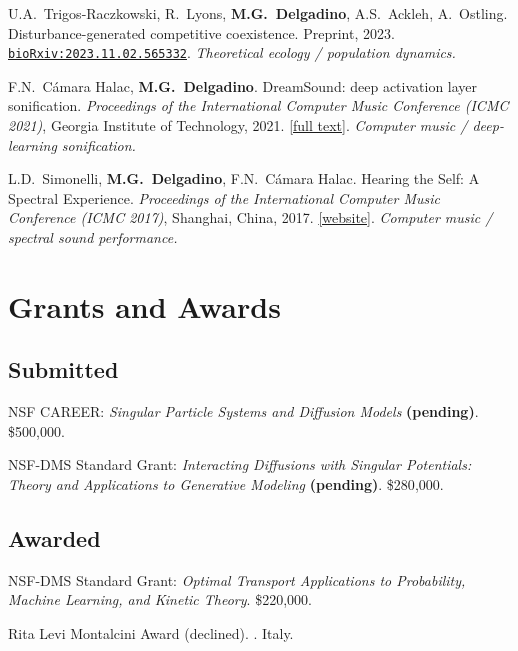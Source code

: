 \documentclass[11pt]{article}
\newcommand{\entry}[2]{%
  \par\addvspace{0.6ex}\noindent
  \begin{list}{}{%
    \setlength{\leftmargin}{1.5in}%
    \setlength{\labelwidth}{1.4in}%
    \setlength{\labelsep}{0.1in}%
  }%
  \item[\textsf{\small #1}] #2
  \end{list}
}
\newcommand{\pub}[2]{%
  \par\addvspace{0.5ex}\noindent
  \begin{list}{}{%
    \setlength{\leftmargin}{2.4em}%
    \setlength{\labelwidth}{2.4em}%
    \setlength{\labelsep}{0.3em}%
  }%
  \item[{[#1]}] #2
  \end{list}
}
\begin{document}
\pub{I.3}{U.A.~Trigos-Raczkowski, R.~Lyons, \textbf{M.G.~Delgadino}, A.S.~Ackleh, A.~Ostling. Disturbance-generated competitive coexistence. Preprint, 2023. \href{https://www.biorxiv.org/content/10.1101/2023.11.02.565332v1}{\texttt{bioRxiv:2023.11.02.565332}}. \emph{Theoretical ecology / population dynamics.}}

\pub{I.2}{F.N.~C\'amara Halac, \textbf{M.G.~Delgadino}. DreamSound: deep activation layer sonification. \emph{Proceedings of the International Computer Music Conference (ICMC 2021)}, Georgia Institute of Technology, 2021. \href{https://repository.gatech.edu/bitstreams/98395792-aa54-49e8-9ba4-f0d34d2aba17/download}{[full text]}. \emph{Computer music / deep-learning sonification.}}

\pub{I.1}{L.D.~Simonelli, \textbf{M.G.~Delgadino}, F.N.~C\'amara Halac. Hearing the Self: A Spectral Experience. \emph{Proceedings of the International Computer Music Conference (ICMC 2017)}, Shanghai, China, 2017. \href{https://fdch.github.io/specexp/}{[website]}. \emph{Computer music / spectral sound performance.}}

\section{Grants and Awards}

\subsection*{Submitted}
\entry{2026--2031}{NSF CAREER: \emph{Singular Particle Systems and Diffusion Models} \textbf{(pending)}. \$500{,}000.}

\entry{2026--2029}{NSF-DMS Standard Grant: \emph{Interacting Diffusions with Singular Potentials: Theory and Applications to Generative Modeling} \textbf{(pending)}. \$280{,}000.}

\subsection*{Awarded}

\entry{2022--2026}{NSF-DMS Standard Grant: \emph{Optimal Transport Applications to Probability, Machine Learning, and Kinetic Theory}. \$220{,}000.}

\entry{2020}{Rita Levi Montalcini Award (declined). \EUR{195{,}000}. Italy.}
\end{document}
